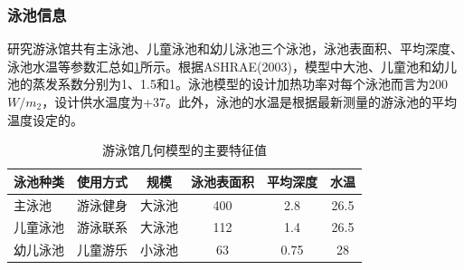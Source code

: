 \documentclass[hyperref]{ctexart}
\begin{document}
\begin{multicols}{2}
		\subsubsection{泳池信息}
		研究游泳馆共有主泳池、儿童泳池和幼儿泳池三个泳池，泳池表面积、平均深度、泳池水温等参数汇总如\cref{tab5}所示。根据ASHRAE(2003)\cite{article39}，模型中大池、儿童池和幼儿池的蒸发系数分别为1、1.5和1。泳池模型的设计加热功率对每个泳池而言为200 $W/m_{2}$，设计供水温度为+37\textcelsius。此外，泳池的水温是根据最新测量的游泳池的平均温度设定的。
		\par
		\begin{table}[htbp]
			\centering
			\caption{游泳馆几何模型的主要特征值}
			\begin{tabular}{llcccc}
				\toprule    
				泳池种类 & 使用方式 & 规模 & 泳池表面积 & 平均深度 & 水温\\
				\midrule
				主泳池   & 游泳健身 & 大泳池 & 400 & 2.8  & 26.5\\
				儿童泳池 & 游泳联系 & 大泳池 & 112 & 1.4  & 26.5\\
				幼儿泳池 & 儿童游乐 & 小泳池 & 63  & 0.75 & 28  \\
				\bottomrule  
			\end{tabular}
			\label{tab5}
		\end{table}

\end{multicols}
\end{document}
